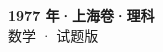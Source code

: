 \documentclass[zihao=-4, a4paper]{ctexart}
\begin{document}
\begin{center}
  {\Large\bfseries 1977 年·上海卷·理科}\\[4pt]
  {\large 数学 · 试题版}
\end{center}
\medskip
{}

\end{document}
